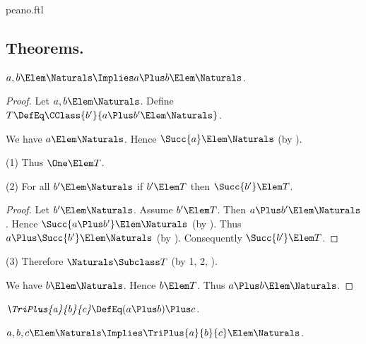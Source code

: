 \documentclass{stex}
\begin{document}
\begin{smodule}{peano.ftl}
\subsection{Theorems.}


\begin{forthel}
  \begin{theorem*}[title=19,name=P19]
    $a,b \Elem \Naturals \Implies a \Plus b \Elem \Naturals$.
  \end{theorem*}
  \begin{proof}
    Let $a,b \Elem \Naturals$.
    Define $T \DefEq \CClass{b'}{a \Plus b' \Elem \Naturals}$.
    
    We have $a \Elem \Naturals$.
    Hence $\Succ{a} \Elem \Naturals$ (by ).
    
    (1) Thus $\One \Elem T$.

    (2) For all $b' \Elem \Naturals$ if $b' \Elem T$ then $\Succ{b'} \Elem T$.
    \begin{proof}
      Let $b' \Elem \Naturals$.
      Assume $b' \Elem T$.
      Then $a \Plus b' \Elem \Naturals$.
      Hence $\Succ{a \Plus b'} \Elem \Naturals$ (by ).
      Thus $a \Plus \Succ{b'} \Elem \Naturals$ (by ).
      Consequently $\Succ{b'} \Elem T$.
    \end{proof}

    (3) Therefore $\Naturals \Subclass T$ (by 1, 2, ).

    We have $b \Elem \Naturals$.
    Hence $b \Elem T$.
    Thus $a \Plus b \Elem \Naturals$.
  \end{proof}

  \begin{definition*}[title=20,for=TriPlus]
    $\emph{\TriPlus{a}{b}{c}} \DefEq (a \Plus b) \Plus c$.
  \end{definition*}

  \begin{theorem*}[title=21,name=P21]
    $a,b,c \Elem \Naturals \Implies \TriPlus{a}{b}{c} \Elem \Naturals$.
  \end{theorem*}



\end{forthel}
\end{smodule}
\end{document}
